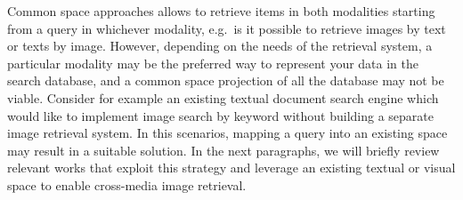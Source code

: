 Common space approaches allows to retrieve items in both modalities starting from a query in whichever modality, e.g.\ is it possible to retrieve images by text or texts by image.
However, depending on the needs of the retrieval system, a particular modality may be the preferred way to represent your data in the search database, and a common space projection of all the database may not be viable.
Consider for example an existing textual document search engine which would like to implement image search by keyword without building a separate image retrieval system.
In this scenarios, mapping a query into an existing space may result in a suitable solution.
In the next paragraphs, we will briefly review relevant works that exploit this strategy and leverage an existing textual or visual space to enable cross-media image retrieval.

